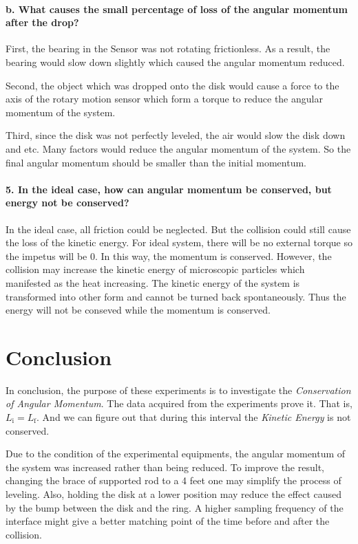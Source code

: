 \paragraph{b. What causes the small percentage of loss of the angular momentum after the drop?}First, the bearing in the Sensor was not rotating frictionless. As a result, the bearing would slow down slightly which caused the angular momentum reduced.\par
Second, the object which was dropped onto the disk would cause a force to the axis of the rotary motion sensor which form a torque to reduce the angular momentum of the system. \par
Third, since the disk was not perfectly leveled, the air would slow the disk down and etc. Many factors would reduce the angular momentum of the system. So the final angular momentum should be smaller than the initial momentum.
\paragraph{5. In the ideal case, how can angular momentum be conserved, but energy not be conserved?}
In the ideal case, all friction could be neglected. But the collision could still cause the loss of the kinetic energy. For ideal system, there will be no external torque so the impetus will be $0$. In this way, the momentum is conserved. However, the collision may increase the kinetic energy of microscopic particles which manifested as the heat increasing. The kinetic energy of the system is transformed into other form and cannot be turned back spontaneously. Thus the energy will not be conseved while the momentum is conserved.

\section{Conclusion}
In conclusion, the purpose of these experiments is to investigate the \emph{Conservation of Angular Momentum}. The data acquired from the experiments prove it. That is, $L_{\text{i}}=L_{\text{f}}$. And we can figure out that during this interval the \emph{Kinetic Energy} is not conserved.\par
Due to the condition of the experimental equipments, the angular momentum of the system was increased rather than being reduced. To improve the result, changing the brace of supported rod to a 4 feet one may simplify the process of leveling. Also, holding the disk at a lower position may reduce the effect caused by the bump between the disk and the ring. A higher sampling frequency of the interface might give a better matching point of the time before and after the collision.


